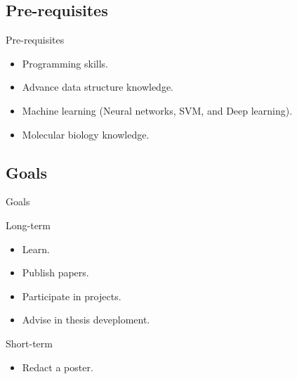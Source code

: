 \documentclass[10pt]{beamer}
\newcommand{\1}{
        	\setbeamertemplate{background}{
        		\texttt{[image: img/1]}
        		\tikz[overlay] \fill[fill opacity=0.75,fill=white] (0,0) rectangle (-\paperwidth,\paperheight);
        	}
}
\begin{document}
\subsection{Pre-requisites}

\begin{frame}{Pre-requisites}{}
	\begin{block}{}
		\begin{itemize}
			\item Programming skills. \pause
			\item Advance data structure knowledge. \pause
			\item Machine learning (Neural networks, SVM, and Deep learning). \pause
			\item Molecular biology knowledge. 
		\end{itemize}
	\end{block}
\end{frame}

\subsection{Goals}

\begin{frame}{Goals}{}
	\begin{block}{Long-term}
		\begin{itemize}
			\item Learn. \pause
			\item Publish papers. \pause
			\item Participate in projects. \pause
			\item Advise in thesis deveploment. \pause
		\end{itemize}
	\end{block}

	\begin{block}{Short-term}
		\begin{itemize}
			\item Redact a poster. 
		\end{itemize}
	\end{block}
\end{frame}
\end{document}
